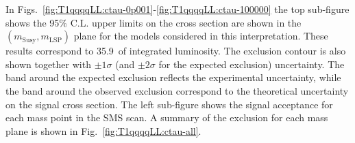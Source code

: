 In Figs.~\ref{fig:T1qqqqLL:ctau-0p001}-\ref{fig:T1qqqqLL:ctau-100000}
the top sub-figure shows the 95\% C.L. upper limits on the cross
section are shown in the $(m_{\mathrm{Susy}},m_{\mathrm{LSP}})$ plane
for the models considered in this interpretation. These results
correspond to 35.9~\ifb of integrated luminosity. The exclusion
contour is also shown together with $\pm1\sigma$ (and $\pm2\sigma$ for
the expected exclusion) uncertainty.  The band around the expected
exclusion reflects the experimental uncertainty, while the band around
the observed exclusion correspond to the theoretical uncertainty on
the signal cross section. The left sub-figure shows the signal
acceptance for each mass point in the SMS scan. A summary of the
exclusion for each \ctau mass plane is shown in Fig.~\ref{fig:T1qqqqLL:ctau-all}.

